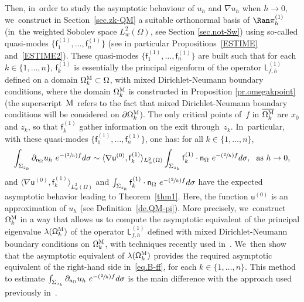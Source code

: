 \documentclass[JEP,XML,SOM,Unicode,NoEqCountersInSection,NoFloatCountersInSection,published]{cedram}
\newcommand{\Psfrac}[2]{(\sfrac{#1}{#2})}
\let\ts\textstyle
\theoremstyle{plain}
\theoremstyle{definition}
\begin{document}
Then, in~order to study the asymptotic behaviour of $u_h$ and
$\nabla u_h$ when $h\to 0$, we~construct in Section~\ref{sec.zk-QM} a suitable
orthonormal basis of $\Ran \pi_h^{(1)} $ (in~the weighted Sobolev space $L^2_w(\Omega)$, see Section \ref{sec.not-Sw}) using so-called
quasi-modes $\{\mathsf f_1^{(1)}, \ldots, \mathsf f_n^{(1)}\} $ (see
in particular
Propositions~\ref{ESTIME} and~\ref{ESTIME2}). These quasi-modes $\{\mathsf f_1^{(1)}, \ldots, \mathsf
f_n^{(1)}\} $ are built such that for each $k\in \{1,\ldots,n\}$,
$\mathsf f_k^{(1)} $ is essentially the principal eigenform of the
operator $\mathsf L^{(1)}_{f,h}$ defined on a domain
$\Omega_k^{\textsc{M}} \subset \Omega$,
with mixed Dirichlet-Neumann boundary conditions, where the domain $\Omega_k^{\textsc{M}}$ is constructed in Proposition \ref{pr.omegakpoint} (the superscript~${\textsc{M}}$ refers to the fact that mixed Dirichlet-Neumann
boundary conditions will be considered on $\partial
\Omega_k^{\textsc{M}}$). The only critical points of~$f$ in
$\overline{\Omega_k^{\textsc{M}}}$ are $x_0$ and $z_k$, so that
$\mathsf f_k^{(1)}$ gather information on the exit through~$z_k$. In~particular, with these quasi-modes $\{\mathsf f_1^{(1)}, \ldots,
\mathsf f_n^{(1)}\} $, one has: for all $k\in \{1,\ldots,n\}$,\vspace*{-3pt}
\begin{equation}\label{eq.B-ff}
\int_{\Sigma_{z_k}} \partial_{\mathsf n_\Omega}
u_h \ e^{-\Psfrac{2}{h} f} d\sigma
\sim \langle \nabla \mathsf u^{(0)}, \mathsf f_k^{(1)} \rangle_{L^2_w(\Omega)} \int_{\Sigma_{z_k}} \mathsf f_k^{(1)} \cdot \mathsf n_\Omega \ e^{-\Psfrac{2}{h} f} d\sigma, \ \text{ as $\ts h\to 0$,}
\end{equation}
and $\langle \nabla \mathsf u^{(0)}, \mathsf f_k^{(1)} \rangle_{L^2_w(\Omega)}$ and $\int_{\Sigma_{z_k}} \mathsf f_k^{(1)} \cdot \mathsf
n_\Omega \ e^{-\Psfrac{2}{h} f} d\sigma$ have the expected
asymptotic behavior leading to Theorem~\ref{thm1}. Here, the function $\mathsf u^{(0)}$ is an approximation of $u_h$ (see Definition~\ref{de.QM-pi}). More precisely, we~construct $\Omega_k^{\textsc{M}}$ in a way that allows us to \hbox{compute} the asymptotic equivalent of the principal eigenvalue $\lambda(\mathsf
\Omega_k^{\textsc{M}})$ of the operator $\mathsf L^{(1)}_{f,h}$ defined with mixed Dirichlet-Neumann boundary conditions on
$\Omega_k^{\textsc{M}}$, with techniques recently used in~\cite{DoNe2}. We~then show that the asymptotic equivalent of $\lambda(\mathsf
\Omega_k^{\textsc{M}})$ provides the required asymptotic equivalent
of the right-hand side in~\eqref{eq.B-ff}, for each $k\in
\{1,\ldots,n\}$. This method to estimate $\int_{\Sigma_{z_k}} \partial_{\mathsf n_\Omega}
u_h \ e^{-\Psfrac{2}{h} f} d\sigma$
is the main difference with
the approach used previously in~\cite{DLLN}.
\end{document}
